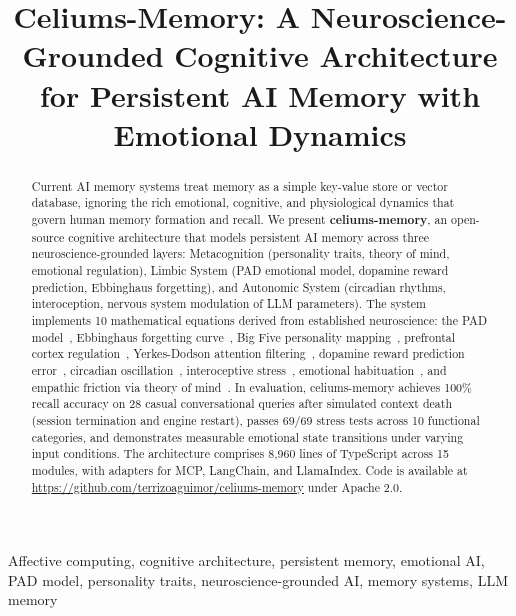 \documentclass[journal,twoside]{IEEEtran}
\begin{document}
\title{Celiums-Memory: A Neuroscience-Grounded Cognitive Architecture for Persistent AI Memory with Emotional Dynamics}

\author{
}

\maketitle

\begin{abstract}
Current AI memory systems treat memory as a simple key-value store or vector database, ignoring the rich emotional, cognitive, and physiological dynamics that govern human memory formation and recall. We present \textbf{celiums-memory}, an open-source cognitive architecture that models persistent AI memory across three neuroscience-grounded layers: Metacognition (personality traits, theory of mind, emotional regulation), Limbic System (PAD emotional model, dopamine reward prediction, Ebbinghaus forgetting), and Autonomic System (circadian rhythms, interoception, nervous system modulation of LLM parameters). The system implements 10 mathematical equations derived from established neuroscience: the PAD model~\cite{mehrabian1996}, Ebbinghaus forgetting curve~\cite{ebbinghaus1885}, Big Five personality mapping~\cite{costa1992}, prefrontal cortex regulation~\cite{ledoux2000}, Yerkes-Dodson attention filtering~\cite{yerkes1908}, dopamine reward prediction error~\cite{schultz1997}, circadian oscillation~\cite{moore1972}, interoceptive stress~\cite{craig2002}, emotional habituation~\cite{rankin2009}, and empathic friction via theory of mind~\cite{premack1978}. In evaluation, celiums-memory achieves 100\% recall accuracy on 28 casual conversational queries after simulated context death (session termination and engine restart), passes 69/69 stress tests across 10 functional categories, and demonstrates measurable emotional state transitions under varying input conditions. The architecture comprises 8,960 lines of TypeScript across 15 modules, with adapters for MCP, LangChain, and LlamaIndex. Code is available at \url{https://github.com/terrizoaguimor/celiums-memory} under Apache 2.0.
\end{abstract}

\begin{IEEEkeywords}
Affective computing, cognitive architecture, persistent memory, emotional AI, PAD model, personality traits, neuroscience-grounded AI, memory systems, LLM memory
\end{IEEEkeywords}
\end{document}
